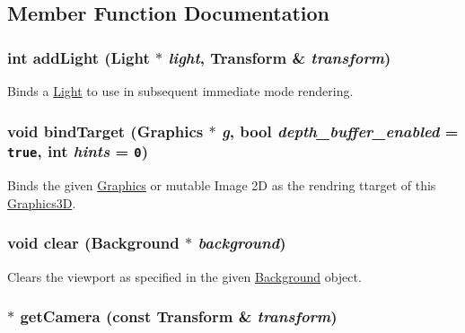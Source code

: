 \subsection{Member Function Documentation}
\hypertarget{classm3g_1_1Graphics3D_e210cacb72c8540df86a6674e3c2dc4f}{
\subsubsection[{addLight}]{\setlength{\rightskip}{0pt plus 5cm}int addLight ({\bf Light} $\ast$ {\em light}, \/  {\bf Transform} \& {\em transform})}}
\label{classm3g_1_1Graphics3D_e210cacb72c8540df86a6674e3c2dc4f}


Binds a \hyperlink{classm3g_1_1Light}{Light} to use in subsequent immediate mode rendering. \hypertarget{classm3g_1_1Graphics3D_2173e179f4b2d7130cde46a48794ee66}{
\subsubsection[{bindTarget}]{\setlength{\rightskip}{0pt plus 5cm}void bindTarget ({\bf Graphics} $\ast$ {\em g}, \/  bool {\em depth\_\-buffer\_\-enabled} = {\tt true}, \/  int {\em hints} = {\tt 0})}}
\label{classm3g_1_1Graphics3D_2173e179f4b2d7130cde46a48794ee66}


Binds the given \hyperlink{classm3g_1_1Graphics}{Graphics} or mutable Image 2D as the rendring ttarget of this \hyperlink{classm3g_1_1Graphics3D}{Graphics3D}. \hypertarget{classm3g_1_1Graphics3D_21c4a68a53cfbe0a7cec05d5a56682bf}{
\subsubsection[{clear}]{\setlength{\rightskip}{0pt plus 5cm}void clear ({\bf Background} $\ast$ {\em background})}}
\label{classm3g_1_1Graphics3D_21c4a68a53cfbe0a7cec05d5a56682bf}


Clears the viewport as specified in the given \hyperlink{classm3g_1_1Background}{Background} object. \hypertarget{classm3g_1_1Graphics3D_570b81f426d1b2b5e8794cffb33422c6}{
\subsubsection[{getCamera}]{ $\ast$ getCamera (const {\bf Transform} \& {\em transform})}}
\label{classm3g_1_1Graphics3D_570b81f426d1b2b5e8794cffb33422c6}


